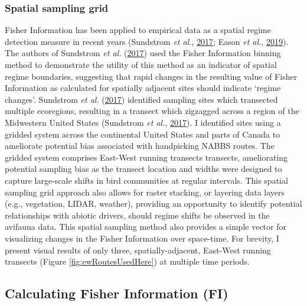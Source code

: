 \documentclass[print]{nuthesis}
\begin{document}
\hypertarget{spatial-sampling-grid}{%
\subsubsection{Spatial sampling grid}\label{spatial-sampling-grid}}

Fisher Information has been applied to empirical data as a spatial regime detection measure in recent years (Sundstrom \emph{et al.}, \protect\hyperlink{ref-sundstrom2017detecting}{2017}; Eason \emph{et al.}, \protect\hyperlink{ref-eason2019information}{2019}). The authors of Sundstrom \emph{et al.} (\protect\hyperlink{ref-sundstrom2017detecting}{2017}) used the Fisher Information binning method to demonstrate the utility of this method as an indicator of spatial regime boundaries, suggesting that rapid changes in the resulting value of Fisher Information as calculated for spatially adjacent sites should indicate `regime changes'. Sundstrom \emph{et al.} (\protect\hyperlink{ref-sundstrom2017detecting}{2017}) identified sampling sites which transected multiple ecoregions, resulting in a transect which zigzagged across a region of the Midwestern United States (Sundstrom \emph{et al.}, \protect\hyperlink{ref-sundstrom2017detecting}{2017}). I identified sites using a gridded system across the continental United States and parts of Canada to ameliorate potential bias associated with handpicking NABBS routes. The gridded system comprises East-West running transects transects, ameliorating potential sampling bias as the transect location and widths were designed to capture large-scale shifts in bird communities at regular intervals. This spatial sampling grid approach also allows for raster stacking, or layering data layers (e.g., vegetation, LIDAR, weather), providing an opportunity to identify potential relationships with abiotic drivers, should regime shifts be observed in the avifauna data. This spatial sampling method also provides a simple vector for visualizing changes in the Fisher Information over space-time. For brevity, I present visual results of only three, spatially-adjacent, East-West running transects (Figure \ref{fig:ewRoutesUsedHere}) at multiple time periods.

\hypertarget{calculating-fisher-information-fi}{%
\subsection{Calculating Fisher Information (FI)}\label{calculating-fisher-information-fi}}
\end{document}
